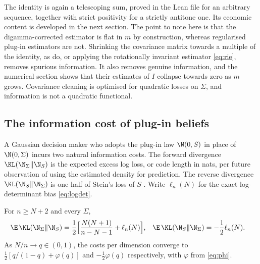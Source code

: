 The identity is again a telescoping sum, proved in the Lean file for an arbitrary sequence, together with strict positivity for a strictly antitone one. Its economic content is developed in the next section. The point to note here is that the digamma-corrected estimator is flat in $m$ by construction, whereas regularised plug-in estimators are not. Shrinking the covariance matrix towards a multiple of the identity, as \citet{ledoit2004well} do, or applying the rotationally invariant estimator \eqref{eq:rie}, removes spurious information. It also removes genuine information, and the numerical section shows that their estimates of $I$ collapse towards zero as $m$ grows. Covariance cleaning is optimised for quadratic losses on $\Sigma$, and information is not a quadratic functional.

\subsection*{The information cost of plug-in beliefs}

A Gaussian decision maker who adopts the plug-in law $\N(0,S)$ in place of $\N(0,\Sigma)$ incurs two natural information costs. The forward divergence $\KL(\N_\Sigma\|\N_S)$ is the expected excess log loss, or code length in nats, per future observation of using the estimated density for prediction. The reverse divergence $\KL(\N_S\|\N_\Sigma)$ is one half of Stein's loss of $S$ \citep{james1961estimation}. Write $\ell_n(N)$ for the exact log-determinant bias \eqref{eq:logdet}.

\begin{proposition*}
For $n\geq N+2$ and every $\Sigma$,
\begin{align*}
 \E\,\KL(\N_\Sigma\|\N_S)&=\frac12\Bigl[\frac{N(N+1)}{n-N-1}+\ell_n(N)\Bigr],&
 \E\,\KL(\N_S\|\N_\Sigma)&=-\frac12\ell_n(N).
\end{align*}
As $N/n\to q\in(0,1)$, the costs per dimension converge to $\tfrac12[q/(1-q)+\varphi(q)]$ and $-\tfrac12\varphi(q)$ respectively, with $\varphi$ from \eqref{eq:phi}.
\end{proposition*}

